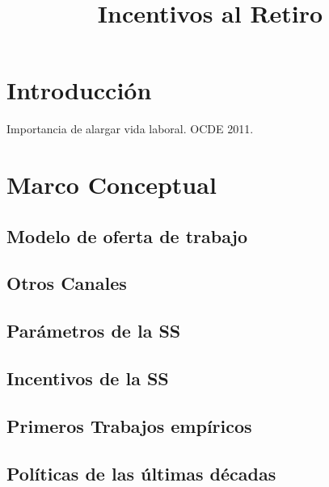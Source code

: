 \documentclass[]{article}
\title{Incentivos al Retiro}
\author{}
\date{\vspace{-2.5em}}
\begin{document}
\maketitle

{
\setcounter{tocdepth}{3}
\tableofcontents
}
\hypertarget{introducciuxf3n}{%
\section{Introducción}\label{introducciuxf3n}}

Importancia de alargar vida laboral. OCDE 2011.

\hypertarget{marco-conceptual}{%
\section{Marco Conceptual}\label{marco-conceptual}}

\hypertarget{modelo-de-oferta-de-trabajo}{%
\subsection{Modelo de oferta de
trabajo}\label{modelo-de-oferta-de-trabajo}}

\hypertarget{otros-canales}{%
\subsection{Otros Canales}\label{otros-canales}}

\hypertarget{paruxe1metros-de-la-ss}{%
\subsection{Parámetros de la SS}\label{paruxe1metros-de-la-ss}}

\hypertarget{incentivos-de-la-ss}{%
\subsection{Incentivos de la SS}\label{incentivos-de-la-ss}}

\hypertarget{primeros-trabajos-empuxedricos}{%
\subsection{Primeros Trabajos
empíricos}\label{primeros-trabajos-empuxedricos}}

\hypertarget{poluxedticas-de-las-uxfaltimas-duxe9cadas}{%
\subsection{Políticas de las últimas
décadas}\label{poluxedticas-de-las-uxfaltimas-duxe9cadas}}
\end{document}

